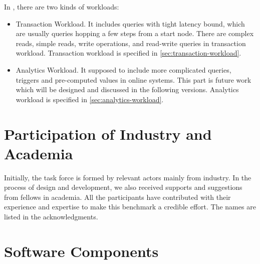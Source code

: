 In \ldbcfinbench, there are two kinds of workloads:
\begin{itemize}
    \item Transaction Workload. It includes queries with tight latency bound, which are usually
          queries hopping a few steps from a start node. There are complex reads, simple reads, write
          operations, and read-write queries in transaction workload. Transaction workload is specified
          in \autoref{sec:transaction-workload}.
    \item Analytics Workload. It supposed to include more complicated queries, \eg triggers and pre-computed
              values in online systems. This part is future work which will be designed and discussed in the
          following versions. Analytics workload is specified in \autoref{sec:analytics-workload}.
\end{itemize}


\section{Participation of Industry and Academia}

Initially, the \ldbcfinbench task force is formed by relevant actors mainly from
industry. In the process of design and development, we also received supports and
suggestions from fellows in academia. All the participants have contributed with
their experience and expertise to make this benchmark a credible effort. The names
are listed in the acknowledgments.


\section{Software Components}

